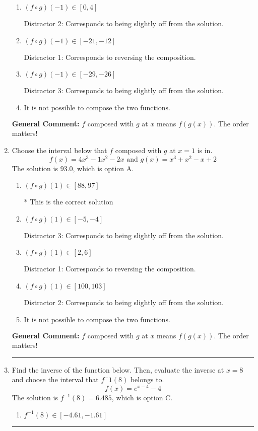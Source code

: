\documentclass{extbook}[14pt]
\newcommand{\litem}[1]{\item #1

\rule{\textwidth}{0.4pt}}
\begin{document}
\begin{enumerate}
{\begin{enumerate}[label=\Alph*.]
* This is the correct solution
\item \( (f \circ g)(-1) \in [0, 4] \)

 Distractor 2: Corresponds to being slightly off from the solution.
\item \( (f \circ g)(-1) \in [-21, -12] \)

 Distractor 1: Corresponds to reversing the composition.
\item \( (f \circ g)(-1) \in [-29, -26] \)

 Distractor 3: Corresponds to being slightly off from the solution.
\item \( \text{It is not possible to compose the two functions.} \)


\end{enumerate}

\textbf{General Comment:} $f$ composed with $g$ at $x$ means $f(g(x))$. The order matters!
}
\litem{
Choose the interval below that $f$ composed with $g$ at $x=1$ is in.
\[ f(x) = 4x^{3} -1 x^{2} -2 x \text{ and } g(x) = x^{3} + x^{2} -x + 2 \]The solution is \( 93.0 \), which is option A.\begin{enumerate}[label=\Alph*.]
\item \( (f \circ g)(1) \in [88, 97] \)

* This is the correct solution
\item \( (f \circ g)(1) \in [-5, -4] \)

 Distractor 3: Corresponds to being slightly off from the solution.
\item \( (f \circ g)(1) \in [2, 6] \)

 Distractor 1: Corresponds to reversing the composition.
\item \( (f \circ g)(1) \in [100, 103] \)

 Distractor 2: Corresponds to being slightly off from the solution.
\item \( \text{It is not possible to compose the two functions.} \)


\end{enumerate}

\textbf{General Comment:} $f$ composed with $g$ at $x$ means $f(g(x))$. The order matters!
}
\litem{
Find the inverse of the function below. Then, evaluate the inverse at $x = 8$ and choose the interval that $f^-1(8)$ belongs to.
\[ f(x) = e^{x-4}-4 \]The solution is \( f^{-1}(8) = 6.485 \), which is option C.\begin{enumerate}[label=\Alph*.]
\item \( f^{-1}(8) \in [-4.61, -1.61] \)


\end{enumerate}}
\end{enumerate}
\end{document}
